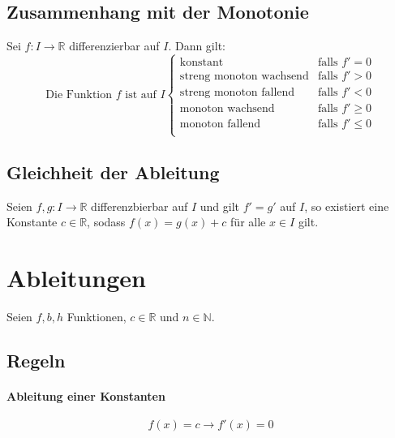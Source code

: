 \documentclass[a4paper, 11pt, accentcolor = tud3b]{tudreport}
\begin{document}
            \subsection{Zusammenhang mit der Monotonie}
                Sei $ f : I \rightarrow \mathbb{R} $ differenzierbar auf $ I $. Dann gilt:
                \begin{equation*}
                    \text{Die Funktion } f \text{ ist auf } I
                    \begin{cases}
                        \text{konstant} & \text{falls } f' = 0 \\
                        \text{streng monoton wachsend} & \text{falls } f' > 0 \\
                        \text{streng monoton fallend} & \text{falls } f' < 0 \\
                        \text{monoton wachsend} & \text{falls } f' \geq 0 \\
                        \text{monoton fallend} & \text{falls } f' \leq 0 \\
                    \end{cases}
                \end{equation*}

            \subsection{Gleichheit der Ableitung}
                Seien $ f, g : I \rightarrow \mathbb{R} $ differenzbierbar auf $ I $ und gilt $ f' = g' $ auf $ I $, so existiert eine Konstante $ c \in \mathbb{R} $, sodass $ f(x) = g(x) + c $ für alle $ x \in I $ gilt.

        \section{Ableitungen}
            Seien $ f, b, h $ Funktionen, $ c \in \mathbb{R} $ und $ n \in \mathbb{N} $.

            \subsection{Regeln}
                \paragraph{Ableitung einer Konstanten}
                    \[ f(x) = c \rightarrow f'(x) = 0 \]
\end{document}
